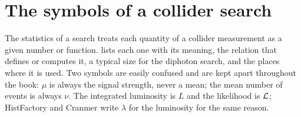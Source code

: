 \section{The symbols of a collider search}
\label{T4a:sec:symbols}

The statistics of a search treats each quantity of a collider measurement as a given number or function.  lists each one with its meaning, the relation that defines or computes it, a typical size for the diphoton search, and the places where it is used. Two symbols are easily confused and are kept apart throughout the book: $\mu$ is always the signal strength, never a mean; the mean number of events is always $\nu$. The integrated luminosity is $L$ and the likelihood is $\mathcal{L}$; HistFactory and Cranmer write $\lambda$ for the luminosity for the same reason.

